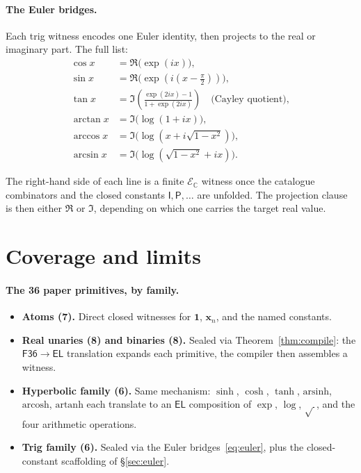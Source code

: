 \documentclass[11pt]{article}
\newcommand{\F}{\mathsf{F36}}
\newcommand{\EL}{\mathsf{EL}}
\newcommand{\EsetC}{\mathcal{E}_{\mathbb{C}}}
\theoremstyle{plain}
\theoremstyle{definition}
\begin{document}
\paragraph{The Euler bridges.}
Each trig witness encodes one Euler identity, then projects to the
real or imaginary part. The full list:
\begin{equation}
\label{eq:euler}
\begin{aligned}
  \cos x &= \Re\bigl(\exp(ix)\bigr), \\
  \sin x &= \Re\bigl(\exp(i(x - \tfrac{\pi}{2}))\bigr), \\
  \tan x &= \Im\!\left(\frac{\exp(2ix) - 1}{1 + \exp(2ix)}\right) \quad \text{(Cayley quotient)}, \\
  \arctan x &= \Im\bigl(\log(1 + ix)\bigr), \\
  \arccos x &= \Im\bigl(\log(x + i\sqrt{1-x^2})\bigr), \\
  \arcsin x &= \Im\bigl(\log(\sqrt{1-x^2} + ix)\bigr).
\end{aligned}
\end{equation}

The right-hand side of each line is a finite $\EsetC$ witness once the
catalogue combinators and the closed constants $\mathsf{I}, \mathsf{P},
\ldots$ are unfolded. The projection clause is then either $\Re$ or
$\Im$, depending on which one carries the target real value.

\section{Coverage and limits}

\paragraph{The 36 paper primitives, by family.}
\begin{itemize}[topsep=2pt, itemsep=2pt]
  \item \textbf{Atoms (7).} Direct closed witnesses for $\mathbf{1}$,
    $\mathbf{x}_n$, and the named constants.
  \item \textbf{Real unaries (8) and binaries (8).} Sealed via
    Theorem~\ref{thm:compile}: the $\F\to\EL$ translation expands
    each primitive, the compiler then assembles a witness.
  \item \textbf{Hyperbolic family (6).} Same mechanism: $\sinh$,
    $\cosh$, $\tanh$, $\mathrm{arsinh}$, $\mathrm{arcosh}$,
    $\mathrm{artanh}$ each translate to an $\EL$ composition of
    $\exp$, $\log$, $\sqrt{\,}$, and the four arithmetic operations.
  \item \textbf{Trig family (6).} Sealed via the Euler
    bridges~\eqref{eq:euler}, plus the closed-constant scaffolding of
    \S\ref{sec:euler}.
\end{itemize}
\end{document}
